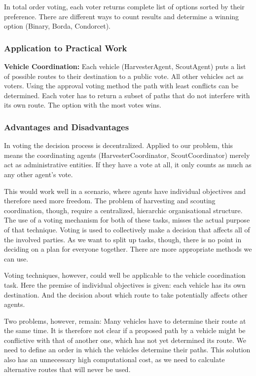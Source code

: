 In total order voting, each voter returns complete list of options sorted by their preference. There are different ways to count results and determine a winning option (Binary, Borda, Condorcet).

\subsubsection{Application to Practical Work}

\textbf{Vehicle Coordination:} Each vehicle (HarvesterAgent, ScoutAgent) puts a list of possible routes to their destination to a public vote. All other vehicles act as voters. Using the approval voting method the path with least conflicts can be determined. Each voter has to return a subset of paths that do not interfere with its own route. The option with the most votes wins.

\subsubsection{Advantages and Disadvantages}

In voting the decision process is decentralized. Applied to our problem, this means the coordinating agents (HarvesterCoordinator, ScoutCoordinator) merely act as administrative entities. If they have a vote at all, it only counts as much as any other agent's vote. 

This would work well in a scenario, where agents have individual objectives and therefore need more freedom. The problem of harvesting and scouting coordination, though, require a centralized, hierarchic organisational structure. The use of a voting mechanism for both of these tasks, misses the actual purpose of that technique. Voting is used to collectively make a decision that affects all of the involved parties. As we want to split up tasks, though, there is no point in deciding on a plan for everyone together. There are more appropriate methods we can use.

Voting techniques, however, could well be applicable to the vehicle coordination task. Here the premise of individual objectives is given: each vehicle has its own destination. And the decision about which route to take potentially affects other agents. 

Two problems, however, remain: Many vehicles have to determine their route at the same time. It is therefore not clear if a proposed path by a vehicle might be conflictive with that of another one, which has not yet determined its route. We need to define an order in which the vehicles determine their paths. This solution also has an unnecessary high computational cost, as we need to calculate alternative routes that will never be used.



